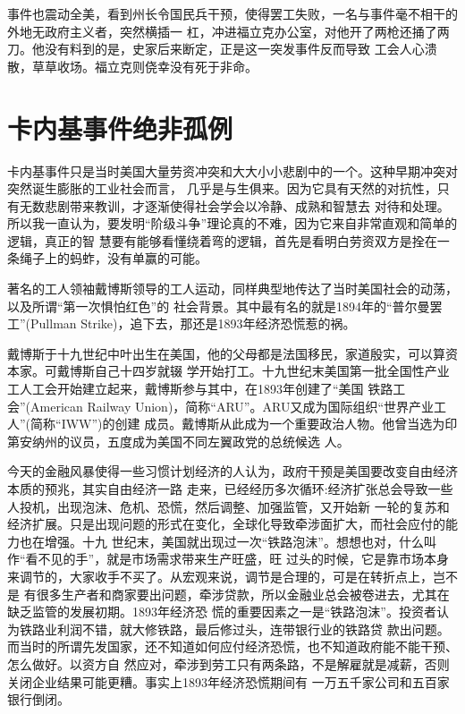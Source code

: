 \documentclass[10pt]{article}
\begin{document}
{事件也震动全美，看到州长令国民兵干预，使得罢工失败，一名与事件毫不相干的外地无政府主义者，突然横插一
杠，冲进福立克办公室，对他开了两枪还捅了两刀。他没有料到的是，史家后来断定，正是这一突发事件反而导致
工会人心溃散，草草收场。福立克则侥幸没有死于非命。

\pagebreak
\section{卡内基事件绝非孤例}

卡内基事件只是当时美国大量劳资冲突和大大小小悲剧中的一个。这种早期冲突对突然诞生膨胀的工业社会而言，
几乎是与生俱来。因为它具有天然的对抗性，只有无数悲剧带来教训，才逐渐使得社会学会以冷静、成熟和智慧去
对待和处理。所以我一直认为，要发明``阶级斗争''理论真的不难，因为它来自非常直观和简单的逻辑，真正的智
慧要有能够看懂绕着弯的逻辑，首先是看明白劳资双方是拴在一条绳子上的蚂蚱，没有单赢的可能。

著名的工人领袖戴博斯领导的工人运动，同样典型地传达了当时美国社会的动荡，以及所谓``第一次惧怕红色''的
社会背景。其中最有名的就是1894年的``普尔曼罢工''(Pullman Strike)，追下去，那还是1893年经济恐慌惹的祸。

戴博斯于十九世纪中叶出生在美国，他的父母都是法国移民，家道殷实，可以算资本家。可戴博斯自己十四岁就辍
学开始打工。十九世纪末美国第一批全国性产业工人工会开始建立起来，戴博斯参与其中，在1893年创建了``美国
铁路工会''(American Railway Union)，简称``ARU''。ARU又成为国际组织``世界产业工人''(简称``IWW'')的创建
成员。戴博斯从此成为一个重要政治人物。他曾当选为印第安纳州的议员，五度成为美国不同左翼政党的总统候选
人。

今天的金融风暴使得一些习惯计划经济的人认为，政府干预是美国要改变自由经济本质的预兆，其实自由经济一路
走来，已经经历多次循环:经济扩张总会导致一些人投机，出现泡沫、危机、恐慌，然后调整、加强监管，又开始新
一轮的复苏和经济扩展。只是出现问题的形式在变化，全球化导致牵涉面扩大，而社会应付的能力也在增强。十九
世纪末，美国就出现过一次``铁路泡沫''。想想也对，什么叫作``看不见的手''，就是市场需求带来生产旺盛，旺
过头的时候，它是靠市场本身来调节的，大家收手不买了。从宏观来说，调节是合理的，可是在转折点上，岂不是
有很多生产者和商家要出问题，牵涉贷款，所以金融业总会被卷进去，尤其在缺乏监管的发展初期。1893年经济恐
慌的重要因素之一是``铁路泡沫''。投资者认为铁路业利润不错，就大修铁路，最后修过头，连带银行业的铁路贷
款出问题。而当时的所谓先发国家，还不知道如何应付经济恐慌，也不知道政府能不能干预、怎么做好。以资方自
然应对，牵涉到劳工只有两条路，不是解雇就是减薪，否则关闭企业结果可能更糟。事实上1893年经济恐慌期间有
一万五千家公司和五百家银行倒闭。

}
\end{document}
